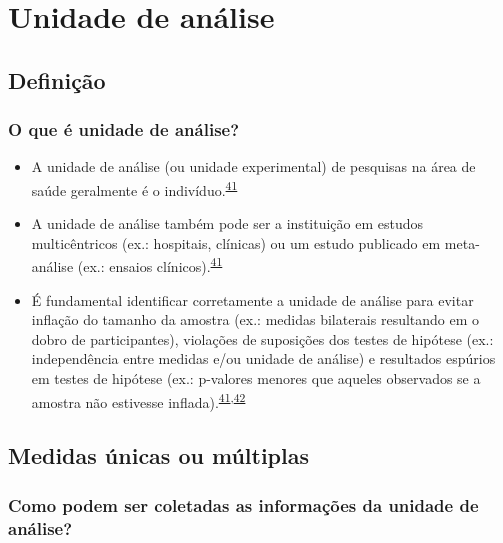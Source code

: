 \documentclass[
  a4paper,
]{book}
\begin{document}
\hypertarget{unidade-analise}{%
\chapter{\texorpdfstring{\textbf{Unidade de análise}}{Unidade de análise}}\label{unidade-analise}}

\hypertarget{definicao}{%
\section{Definição}\label{definicao}}

\hypertarget{o-que-uxe9-unidade-de-anuxe1lise}{%
\subsection{O que é unidade de análise?}\label{o-que-uxe9-unidade-de-anuxe1lise}}

\begin{itemize}
\item
  A unidade de análise (ou unidade experimental) de pesquisas na área de saúde geralmente é o indivíduo.\textsuperscript{\protect\hyperlink{ref-Altman1997}{41}}
\item
  A unidade de análise também pode ser a instituição em estudos multicêntricos (ex.: hospitais, clínicas) ou um estudo publicado em meta-análise (ex.: ensaios clínicos).\textsuperscript{\protect\hyperlink{ref-Altman1997}{41}}
\item
  É fundamental identificar corretamente a unidade de análise para evitar inflação do tamanho da amostra (ex.: medidas bilaterais resultando em o dobro de participantes), violações de suposições dos testes de hipótese (ex.: independência entre medidas e/ou unidade de análise) e resultados espúrios em testes de hipótese (ex.: p-valores menores que aqueles observados se a amostra não estivesse inflada).\textsuperscript{\protect\hyperlink{ref-Altman1997}{41},\protect\hyperlink{ref-Matthews1990}{42}}
\end{itemize}

\hypertarget{medidas}{%
\section{Medidas únicas ou múltiplas}\label{medidas}}

\hypertarget{como-podem-ser-coletadas-as-informauxe7uxf5es-da-unidade-de-anuxe1lise}{%
\subsection{Como podem ser coletadas as informações da unidade de análise?}\label{como-podem-ser-coletadas-as-informauxe7uxf5es-da-unidade-de-anuxe1lise}}
\end{document}
